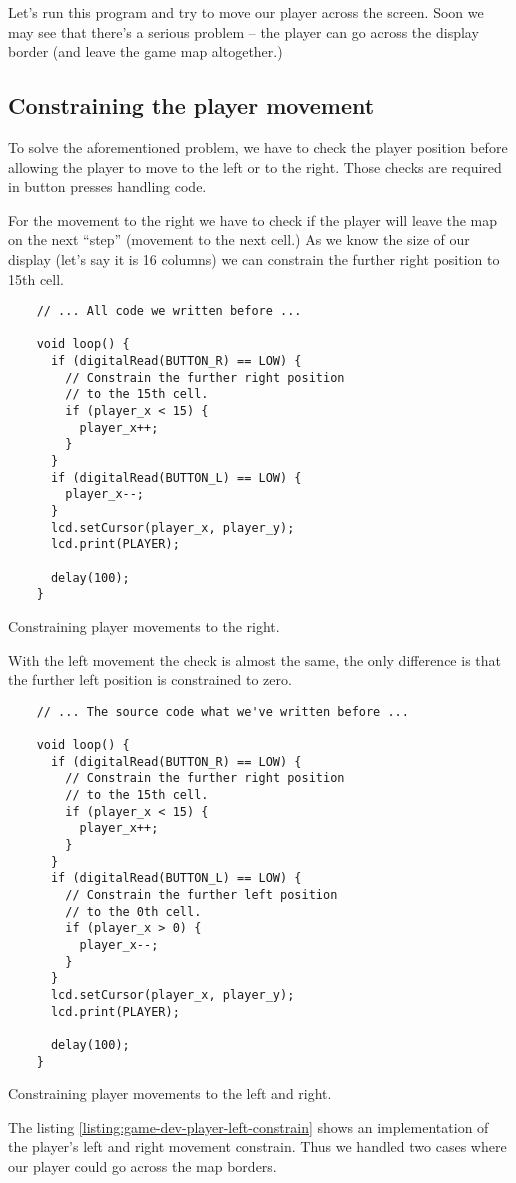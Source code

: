 \documentclass[../sparc.tex]{subfiles}
\begin{document}
Let's run this program and try to move our player across the screen.  Soon we
may see that there's a serious problem -- the player can go across the display
border (and leave the game map altogether.)

\subsection{Constraining the player movement}

To solve the aforementioned problem, we have to check the player position before
allowing the player to move to the left or to the right.  Those checks are
required in button presses handling code.

For the movement to the right we have to check if the player will leave the map
on the next ``step'' (movement to the next cell.)  As we know the size of our
display (let's say it is 16 columns) we can constrain the further right position
to 15th cell.

\begin{listing}[H]
  \begin{verbatim}
    // ... All code we written before ...

    void loop() {
      if (digitalRead(BUTTON_R) == LOW) {
        // Constrain the further right position
        // to the 15th cell.
        if (player_x < 15) {
          player_x++;
        }
      }
      if (digitalRead(BUTTON_L) == LOW) {
        player_x--;
      }
      lcd.setCursor(player_x, player_y);
      lcd.print(PLAYER);

      delay(100);
    }
  \end{verbatim}
  \caption{Constraining player movements to the right.}
  \label{listing:game-dev-player-right--constrain}
\end{listing}

With the left movement the check is almost the same, the only difference is that
the further left position is constrained to zero.

\begin{listing}[ht]
  \begin{verbatim}
    // ... The source code what we've written before ...

    void loop() {
      if (digitalRead(BUTTON_R) == LOW) {
        // Constrain the further right position
        // to the 15th cell.
        if (player_x < 15) {
          player_x++;
        }
      }
      if (digitalRead(BUTTON_L) == LOW) {
        // Constrain the further left position
        // to the 0th cell.
        if (player_x > 0) {
          player_x--;
        }
      }
      lcd.setCursor(player_x, player_y);
      lcd.print(PLAYER);

      delay(100);
    }
  \end{verbatim}
  \caption{Constraining player movements to the left and right.}
  \label{listing:game-dev-player-left-constrain}
\end{listing}

The listing \ref{listing:game-dev-player-left-constrain} shows an implementation
of the player's left and right movement constrain.  Thus we handled two cases
where our player could go across the map borders.
\end{document}
